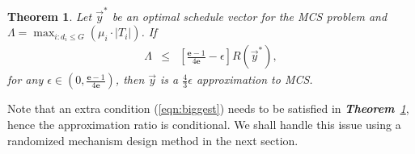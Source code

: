 \documentclass[10pt,journal,compsoc]{IEEEtran}
\newtheorem{theorem}{\textbf{Theorem}}
\begin{document}
  \begin{theorem}
    Let $\vec{y}^*$ be an optimal schedule vector for the MCS problem and $\Lambda= \max_{i:d_i\leq G} (\mu_i\cdot |T_i|)$. If
\begin{eqnarray}
\Lambda &\leq& \left[\frac{\mathbf{e}-1}{4\mathbf{e}}-\epsilon\right]R(\vec{y}^*), \label{eqn:biggest}
    \end{eqnarray}
for any $\epsilon\in (0,\frac{\mathbf{e}-1}{4\mathbf{e}})$, then $\vec{y}$ is a $\frac{4}{3}\epsilon$ approximation to MCS.
    \label{thm:conditionalar}
  \end{theorem}
Note that an extra condition (\ref{eqn:biggest}) needs to be satisfied in \textit{\textbf{Theorem}~\ref{thm:conditionalar}}, hence the approximation ratio is conditional. We shall handle this issue using a randomized mechanism design method in the next section.
\end{document}
